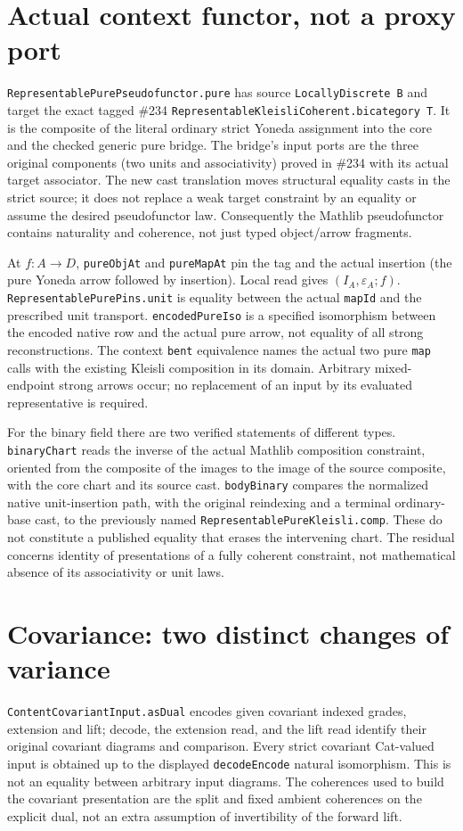 \documentclass[11pt]{article}
\newcommand{\nm}[1]{\nolinkurl{#1}}
\begin{document}
\section*{Actual context functor, not a proxy port}
\nm{RepresentablePurePseudofunctor.pure} has source
\nm{LocallyDiscrete B} and target the exact tagged \#234
\nm{RepresentableKleisliCoherent.bicategory T}. It is the composite of
the literal ordinary strict Yoneda assignment into the core
and the checked generic pure bridge. The bridge's input ports are
the three original components (two units and associativity) proved
in \#234 with its actual target associator. The new cast translation
moves structural equality casts in the strict source; it does not
replace a weak target constraint by an equality or assume the desired
pseudofunctor law. Consequently the Mathlib pseudofunctor contains
naturality and coherence, not just typed object/arrow fragments.

At $f:A\to D$, \nm{pureObjAt} and \nm{pureMapAt} pin the tag and
the actual insertion (the pure
Yoneda arrow followed by insertion). Local read gives
$(I_A,\varepsilon_A;f)$. \nm{RepresentablePurePins.unit} is equality
between the actual \nm{mapId} and the prescribed unit transport.
\nm{encodedPureIso} is a specified isomorphism between the encoded
native row and the actual pure arrow, not equality of all strong
reconstructions. The context \nm{bent} equivalence names the
actual two pure \nm{map} calls with the existing Kleisli composition
in its domain. Arbitrary mixed-endpoint strong arrows occur; no
replacement of an input by its evaluated representative is required.

For the binary field there are two verified statements of different
types. \nm{binaryChart} reads the inverse of the actual Mathlib
composition constraint, oriented from the composite of the images
to the image of the source composite, with the core chart and its
source cast. \nm{bodyBinary} compares the normalized native
unit-insertion path, with the original reindexing and a terminal
ordinary-base cast, to the previously named
\nm{RepresentablePureKleisli.comp}. These do not constitute a
published equality that erases the intervening chart. The residual
concerns identity of presentations of a fully coherent constraint,
not mathematical absence of its associativity or unit laws.

\section*{Covariance: two distinct changes of variance}
\nm{ContentCovariantInput.asDual} encodes given covariant indexed
grades, extension and lift; decode, the extension read, and the lift
read identify their original covariant diagrams and comparison.
Every strict covariant Cat-valued input is obtained up to the displayed
\nm{decodeEncode} natural isomorphism. This is not an equality between
arbitrary input diagrams. The coherences used to build the covariant
presentation are the split and fixed ambient coherences on the explicit
dual, not an extra assumption of invertibility of the forward lift.
\end{document}
